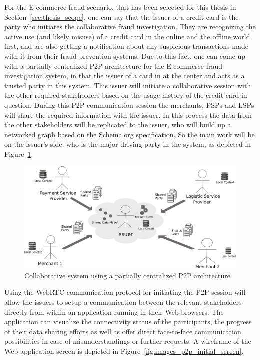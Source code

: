 For the \gls{E-commerce} fraud scenario, that has been selected for this thesis in Section~\ref{sec:thesis_scope}, one can say that the issuer of a credit card is the party who initiates the collaborative fraud investigation. They are recognizing the active use (and likely misuse) of a credit card in the online and the offline world first, and are also getting a notification about any suspicious transactions made with it from their fraud prevention systems. Due to this fact, one can come up with a partially centralized \gls{P2P} architecture for the \gls{E-commerce} fraud investigation system, in that the issuer of a card in at the center and acts as a trusted party in this system. This issuer will initiate a collaborative session with the other required stakeholders based on the usage history of the credit card in question. During this \gls{P2P} communication session the merchants, \gls{PSP}s and \gls{LSP}s will share the required information with the issuer. In this process the data from the other stakeholders will be replicated to the issuer, who will build up a networked graph based on the Schema.org specification. So the main work will be on the issuer's side, who is the major driving party in the system, as depicted in Figure~\ref{fig:images_p2p_centralized}.\@

\begin{figure}[H]
	\centering
		\includegraphics[width=0.9\columnwidth]{images/system_P2P_centralized.pdf}
	\caption{Collaborative system using a partially centralized \gls{P2P} architecture}
\label{fig:images_p2p_centralized}
\end{figure}

Using the \gls{WebRTC} communication protocol for initiating the \gls{P2P} session will allow the issuers to setup a communication between the relevant stakeholders directly from within an application running in their Web browsers. The application can visualize the connectivity status of the participants, the progress of their data sharing efforts as well as offer direct face-to-face communication possibilities in case of misunderstandings or further requests. A wireframe of the Web application screen is depicted in Figure~\ref{fig:images_p2p_initial_screen}. \@

